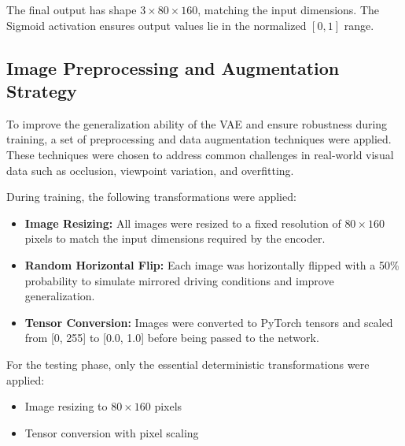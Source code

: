 The final output has shape $3 \times 80 \times 160$, matching the input dimensions. The Sigmoid activation ensures output values lie in the normalized $[0,1]$ range.


\subsection{Image Preprocessing and Augmentation Strategy} \label{subsec:vae_preprocessing}

To improve the generalization ability of the VAE and ensure robustness during training, a set of preprocessing and data augmentation techniques were applied. These techniques were chosen to address common challenges in real-world visual data such as occlusion, viewpoint variation, and overfitting.


During training, the following transformations were applied:
\begin{itemize}
    \item \textbf{Image Resizing:} All images were resized to a fixed resolution of $80 \times 160$ pixels to match the input dimensions required by the encoder.
    \item \textbf{Random Horizontal Flip:} Each image was horizontally flipped with a 50\% probability to simulate mirrored driving conditions and improve generalization.
    \item \textbf{Tensor Conversion:} Images were converted to PyTorch tensors and scaled from [0, 255] to [0.0, 1.0] before being passed to the network.
\end{itemize}


For the testing phase, only the essential deterministic transformations were applied:
\begin{itemize}
    \item Image resizing to $80 \times 160$ pixels
    \item Tensor conversion with pixel scaling
\end{itemize}


